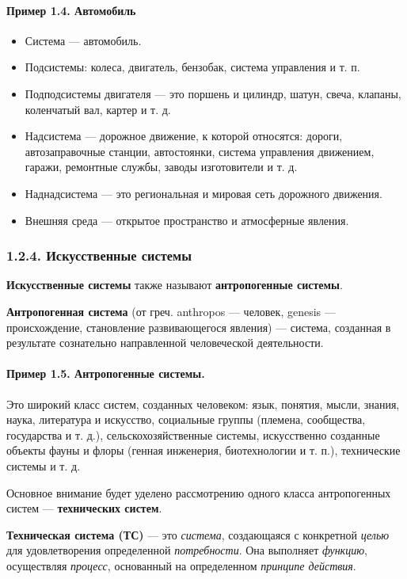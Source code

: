 \documentclass[11pt,a4paper]{article}
\begin{document}
\paragraph{Пример 1.4. Автомобиль}
\begin{itemize}[noitemsep]
\item Система — автомобиль.
\item Подсистемы: колеса, двигатель, бензобак, система управления и т. п.
\item Подподсистемы двигателя — это поршень и цилиндр, шатун, свеча, клапаны,
  коленчатый вал, картер и т. д.
\item Надсистема — дорожное движение, к которой относятся: дороги,
  автозаправочные станции, автостоянки, система управления движением, гаражи,
  ремонтные службы, заводы изготовители и т. д.
\item Наднадсистема — это региональная и мировая сеть дорожного движения.
\item Внешняя среда — открытое пространство и атмосферные явления.
\end{itemize}

\subsubsection*{1.2.4. Искусственные системы}

\textbf{Искусственные системы} также называют \textbf{антропогенные системы}.

\textbf{Антропогенная система} (от греч. anthropos — человек, genesis —
происхождение, становление развивающегося явления) — система, созданная в
результате сознательно направленной человеческой деятельности.

\paragraph{Пример 1.5. Антропогенные системы.}
Это широкий класс систем, созданных человеком: язык, понятия, мысли, знания,
наука, литература и искусство, социальные группы (племена, сообщества,
государства и т. д.), сельскохозяйственные системы, искусственно созданные
объекты фауны и флоры (генная инженерия, биотехнологии и т. п.), технические
системы и т. д.

Основное внимание будет уделено рассмотрению одного класса антропогенных
систем — \textbf{технических систем}.

\textbf{Техническая система (ТС)} — это \emph{система}, создающаяся с
конкретной \emph{целью} для удовлетворения определенной
\emph{потребности}. Она выполняет \emph{функцию}, осуществляя \emph{процесс},
основанный на определенном \emph{принципе действия}.
\end{document}
